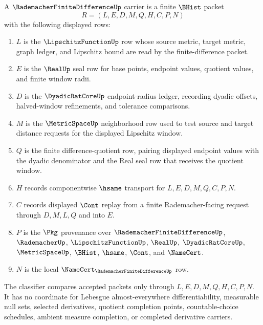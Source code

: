 \begin{definition}
\label{def:rademacher-finite-difference-carrier}
A $\RademacherFiniteDifferenceUp$ carrier is a finite $\BHist$ packet
$$
R=(L,E,D,M,Q,H,C,P,N)
$$
with the following displayed rows:
\begin{enumerate}
\item $L$ is the $\LipschitzFunctionUp$ row whose source metric, target metric, graph ledger, and Lipschitz bound are read by the finite-difference packet.
\item $E$ is the $\RealUp$ seal row for base points, endpoint values, quotient values, and finite window radii.
\item $D$ is the $\DyadicRatCoreUp$ endpoint-radius ledger, recording dyadic offsets, halved-window refinements, and tolerance comparisons.
\item $M$ is the $\MetricSpaceUp$ neighborhood row used to test source and target distance requests for the displayed Lipschitz window.
\item $Q$ is the finite difference-quotient row, pairing displayed endpoint values with the dyadic denominator and the Real seal row that receives the quotient window.
\item $H$ records componentwise $\hsame$ transport for $L,E,D,M,Q,C,P,N$.
\item $C$ records displayed $\Cont$ replay from a finite Rademacher-facing request through $D,M,L,Q$ and into $E$.
\item $P$ is the $\Pkg$ provenance over $\RademacherFiniteDifferenceUp$, $\RademacherUp$, $\LipschitzFunctionUp$, $\RealUp$, $\DyadicRatCoreUp$, $\MetricSpaceUp$, $\BHist$, $\hsame$, $\Cont$, and $\NameCert$.
\item $N$ is the local $\NameCert_{\RademacherFiniteDifferenceUp}$ row.
\end{enumerate}
The classifier compares accepted packets only through $L,E,D,M,Q,H,C,P,N$. It has no coordinate for Lebesgue almost-everywhere differentiability, measurable null sets, selected derivatives, quotient completion points, countable-choice schedules, ambient measure completion, or completed derivative carriers.
\end{definition}

